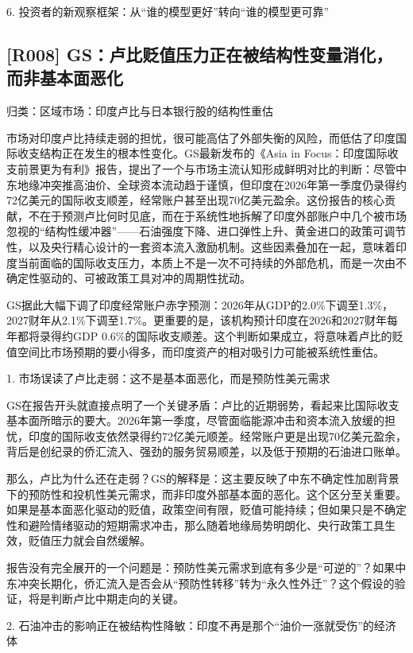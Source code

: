 \documentclass[11pt]{ctexart}
\begin{document}
6. 投资者的新观察框架：从“谁的模型更好”转向“谁的模型更可靠”

\subsection{[R008] GS：卢比贬值压力正在被结构性变量消化，而非基本面恶化}
{\small\color{refgray}归类：区域市场：印度卢比与日本银行股的结构性重估}

市场对印度卢比持续走弱的担忧，很可能高估了外部失衡的风险，而低估了印度国际收支结构正在发生的根本性变化。GS最新发布的《Asia in Focus：印度国际收支前景更为有利》报告，提出了一个与市场主流认知形成鲜明对比的判断：尽管中东地缘冲突推高油价、全球资本流动趋于谨慎，但印度在2026年第一季度仍录得约72亿美元的国际收支顺差，经常账户甚至出现70亿美元盈余。这份报告的核心贡献，不在于预测卢比何时见底，而在于系统性地拆解了印度外部账户中几个被市场忽视的“结构性缓冲器”——石油强度下降、进口弹性上升、黄金进口的政策可调节性，以及央行精心设计的一套资本流入激励机制。这些因素叠加在一起，意味着印度当前面临的国际收支压力，本质上不是一次不可持续的外部危机，而是一次由不确定性驱动的、可被政策工具对冲的周期性扰动。

GS据此大幅下调了印度经常账户赤字预测：2026年从GDP的2.0\%下调至1.3\%，2027财年从2.1\%下调至1.7\%。更重要的是，该机构预计印度在2026和2027财年每年都将录得约GDP 0.6\%的国际收支顺差。这个判断如果成立，将意味着卢比的贬值空间比市场预期的要小得多，而印度资产的相对吸引力可能被系统性重估。

1. 市场误读了卢比走弱：这不是基本面恶化，而是预防性美元需求

GS在报告开头就直接点明了一个关键矛盾：卢比的近期弱势，看起来比国际收支基本面所暗示的要大。2026年第一季度，尽管面临能源冲击和资本流入放缓的担忧，印度的国际收支依然录得约72亿美元顺差。经常账户更是出现70亿美元盈余，背后是创纪录的侨汇流入、强劲的服务贸易顺差，以及低于预期的石油进口账单。

那么，卢比为什么还在走弱？GS的解释是：这主要反映了中东不确定性加剧背景下的预防性和投机性美元需求，而非印度外部基本面的恶化。这个区分至关重要。如果是基本面恶化驱动的贬值，政策空间有限，贬值可能持续；但如果只是不确定性和避险情绪驱动的短期需求冲击，那么随着地缘局势明朗化、央行政策工具生效，贬值压力就会自然缓解。

报告没有完全展开的一个问题是：预防性美元需求到底有多少是“可逆的”？如果中东冲突长期化，侨汇流入是否会从“预防性转移”转为“永久性外迁”？这个假设的验证，将是判断卢比中期走向的关键。

2. 石油冲击的影响正在被结构性降敏：印度不再是那个“油价一涨就受伤”的经济体
\end{document}
